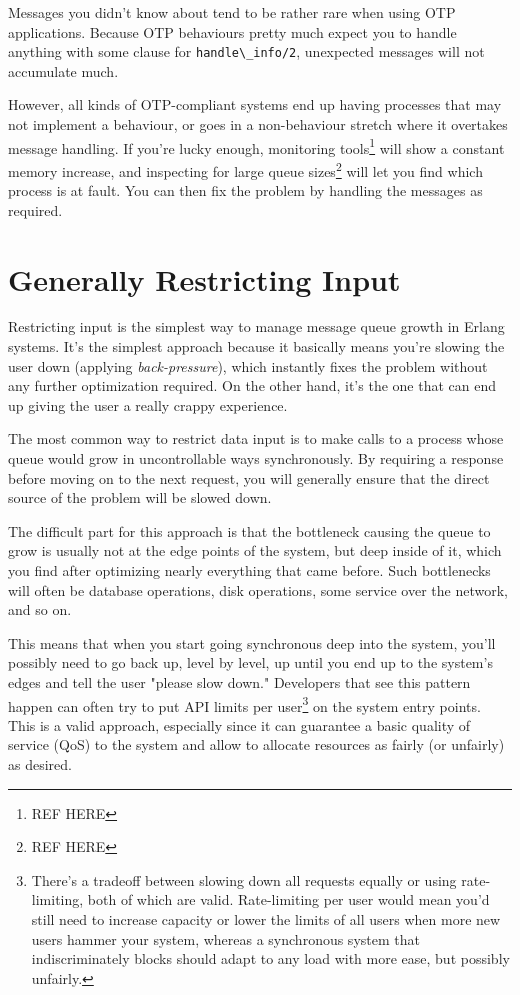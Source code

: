 \documentclass[11pt, oneside]{book}   	%
\newcommand{\function}[1]{\Verb`#1`}
\begin{document}
Messages you didn't know about tend to be rather rare when using OTP applications. Because OTP behaviours pretty much expect you to handle anything with some clause for \function{handle\_info/2}, unexpected messages will not accumulate much.

However, all kinds of OTP-compliant systems end up having processes that may not implement a behaviour, or goes in a non-behaviour stretch where it overtakes message handling. If you're lucky enough, monitoring tools\footnote{REF HERE} will show a constant memory increase, and inspecting for large queue sizes\footnote{REF HERE} will let you find which process is at fault. You can then fix the problem by handling the messages as required.

\section{Generally Restricting Input}

Restricting input is the simplest way to manage message queue growth in Erlang systems. It's the simplest approach because it basically means you're slowing the user down (applying \emph{back-pressure}), which instantly fixes the problem without any further optimization required. On the other hand, it's the one that can end up giving the user a really crappy experience.

The most common way to restrict data input is to make calls to a process whose queue would grow in uncontrollable ways synchronously. By requiring a response before moving on to the next request, you will generally ensure that the direct source of the problem will be slowed down.

The difficult part for this approach is that the bottleneck causing the queue to grow is usually not at the edge points of the system, but deep inside of it, which you find after optimizing nearly everything that came before. Such bottlenecks will often be database operations, disk operations, some service over the network, and so on. 

This means that when you start going synchronous deep into the system, you'll possibly need to go back up, level by level, up until you end up to the system's edges and tell the user "please slow down."
Developers that see this pattern happen can often try to put API limits per user\footnote{There's a tradeoff between slowing down all requests equally or using rate-limiting, both of which are valid. Rate-limiting per user would mean you'd still need to increase capacity or lower the limits of all users when more new users hammer your system, whereas a synchronous system that indiscriminately blocks should adapt to any load with more ease, but possibly unfairly.} on the system entry points. This is a valid approach, especially since it can guarantee a basic quality of service (QoS) to the system and allow to allocate resources as fairly (or unfairly) as desired.
  
\end{document}
